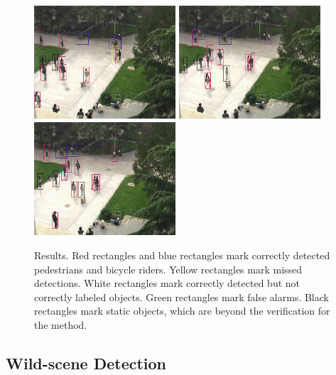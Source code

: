 \begin{figure}
\includegraphics[width=0.47\textwidth,bb=0 0 720 576]{251.jpg}
\includegraphics[width=0.47\textwidth,bb=0 0 720 576]{326.jpg}
\includegraphics[width=0.47\textwidth,bb=0 0 720 576]{366.jpg}
\caption[Detection results]{Results. Red rectangles and blue rectangles mark correctly detected pedestrians and bicycle riders. Yellow rectangles mark missed detections. White rectangles mark correctly detected but not correctly labeled objects. Green rectangles mark false alarms. Black rectangles mark static objects, which are beyond the verification for the method.}
\label{fig:result}
\end{figure}

\subsection{Wild-scene Detection}

